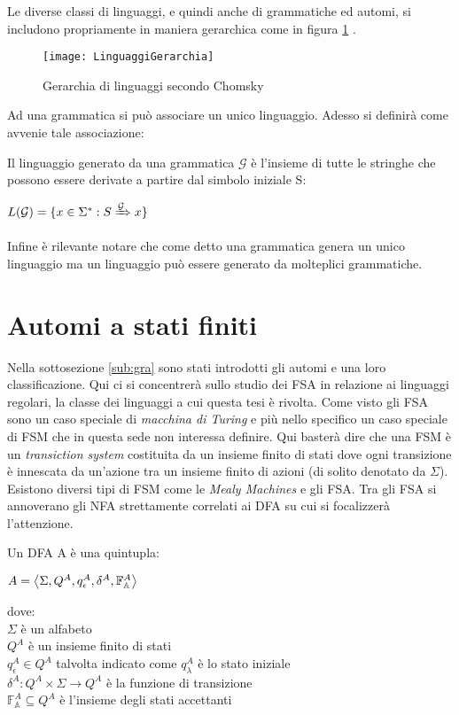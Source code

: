 Le diverse classi di linguaggi, e quindi anche di grammatiche ed automi, si includono propriamente in maniera gerarchica come in figura \ref{fig:linger} .
\begin{figure}[htp]
	\centering
	\texttt{[image: LinguaggiGerarchia]}
	\caption[Gerarchia di linguaggi]{Gerarchia di linguaggi secondo Chomsky}
   \label{fig:linger}
\end{figure}
Ad una grammatica si può associare un unico linguaggio. Adesso si definirà come avvenie tale associazione:
\begin{definizione*}
Il linguaggio generato da una grammatica $\mathcal{G}$ è l'insieme di tutte le stringhe che possono essere derivate a partire dal simbolo iniziale S:\\

\centerline{$L(\mathcal{G}) = \{x \in \Sigma^{*} :S\xRightarrow[]{\mathcal{G}} x\}$}
\end{definizione*}
Infine è rilevante notare che come detto una grammatica genera un unico linguaggio ma un linguaggio può essere generato da molteplici grammatiche.

\section{Automi a stati finiti}
Nella sottosezione \ref{sub:gra} sono stati introdotti gli automi e una loro classificazione. Qui ci si concentrerà sullo studio dei \ac{FSA} in relazione ai linguaggi regolari, la classe dei linguaggi a cui questa tesi è rivolta. Come visto gli \ac{FSA} sono un caso speciale di \textit{macchina di Turing} e più nello specifico un caso speciale di \ac{FSM} che in questa sede non interessa definire. Qui basterà dire che   una \ac{FSM} è un \textit{transiction system} costituita da un insieme finito di stati dove ogni transizione è innescata da un'azione tra un insieme finito di azioni (di solito denotato da $\Sigma$). Esistono diversi tipi di \ac{FSM} come le \textit{Mealy Machines} e gli \ac{FSA}. Tra gli \ac{FSA} si annoverano gli \ac{NFA} strettamente correlati ai \ac{DFA} su cui si focalizzerà l'attenzione.
\begin{definizione}
\label{def:dfa}
Un \ac{DFA} A è una quintupla:\\

\centerline{$A = \Braket{\Sigma,Q^{A},q_{\epsilon}^{A},\delta^{A}, \mathbb{F}_{\mathbb{A}}^{A}}$}
\end{definizione}
dove:\\
$\Sigma$ è un alfabeto\\
$Q^{A}$ è un insieme finito di stati\\
$q_{\epsilon}^{A} \in Q^{A}$ talvolta indicato come $q_{\lambda}^{A}$ è lo stato iniziale\\
$\delta^{A} : Q^{A} \times \Sigma \to Q^{A} $ è la funzione di transizione\\
$\mathbb{F}_{\mathbb{A}}^{A} \subseteq Q^{A}$ è l'insieme degli stati accettanti\\

